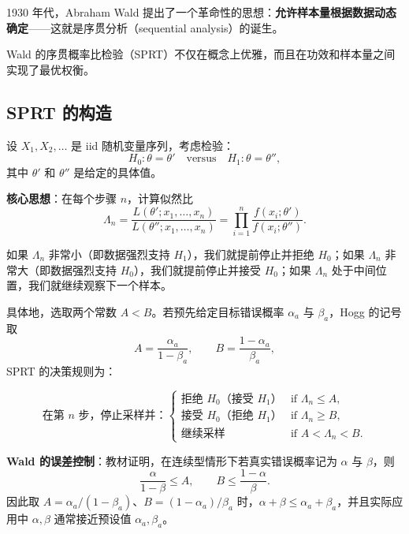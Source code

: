 1930 年代，Abraham Wald 提出了一个革命性的思想：\textbf{允许样本量根据数据动态确定}——这就是序贯分析（sequential analysis）的诞生。

Wald 的序贯概率比检验（SPRT）不仅在概念上优雅，而且在功效和样本量之间实现了最优权衡。

\subsection{SPRT 的构造}

设 $X_1, X_2, \ldots$ 是 iid 随机变量序列，考虑检验：
\[
H_0: \theta = \theta' \quad \text{versus} \quad H_1: \theta = \theta'',
\]
其中 $\theta'$ 和 $\theta''$ 是给定的具体值。

\textbf{核心思想}：在每个步骤 $n$，计算似然比
\[
\Lambda_n = \frac{L(\theta'; x_1, \ldots, x_n)}{L(\theta''; x_1, \ldots, x_n)} = \prod_{i=1}^n \frac{f(x_i; \theta')}{f(x_i; \theta'')}.
\]

如果 $\Lambda_n$ 非常小（即数据强烈支持 $H_1$），我们就提前停止并拒绝 $H_0$；如果 $\Lambda_n$ 非常大（即数据强烈支持 $H_0$），我们就提前停止并接受 $H_0$；如果 $\Lambda_n$ 处于中间位置，我们就继续观察下一个样本。

具体地，选取两个常数 $A < B$。若预先给定目标错误概率 $\alpha_a$ 与 $\beta_a$，Hogg 的记号取
\[
A = \frac{\alpha_a}{1-\beta_a}, \qquad B = \frac{1-\alpha_a}{\beta_a},
\]
SPRT 的决策规则为：

\[
\text{在第 $n$ 步，停止采样并：}
\begin{cases}
\text{拒绝 $H_0$（接受 $H_1$）} & \text{if } \Lambda_n \leq A, \\
\text{接受 $H_0$（拒绝 $H_1$）} & \text{if } \Lambda_n \geq B, \\
\text{继续采样} & \text{if } A < \Lambda_n < B.
\end{cases}
\label{eq:sprt-rule}
\]

\textbf{Wald 的误差控制}：教材证明，在连续型情形下若真实错误概率记为 $\alpha$ 与 $\beta$，则
\[
\frac{\alpha}{1-\beta} \leq A, \qquad B \leq \frac{1-\alpha}{\beta}.
\]
因此取 $A=\alpha_a/(1-\beta_a)$、$B=(1-\alpha_a)/\beta_a$ 时，$\alpha+\beta \leq \alpha_a+\beta_a$，并且实际应用中 $\alpha,\beta$ 通常接近预设值 $\alpha_a,\beta_a$。

